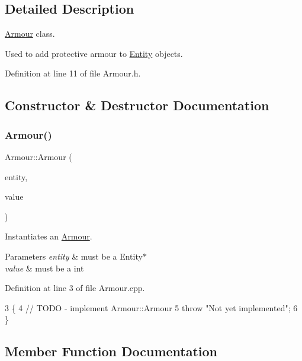 \subsection{Detailed Description}
\hyperlink{classArmour}{Armour} class. 

Used to add protective armour to \hyperlink{classEntity}{Entity} objects. 

Definition at line 11 of file Armour.\+h.



\subsection{Constructor \& Destructor Documentation}
\mbox{\label{classArmour_a795c5149e3e502530926aff4a6ade971}} 
\subsubsection{\texorpdfstring{Armour()}{Armour()}}
{\footnotesize\ttfamily Armour\+::\+Armour (\begin{DoxyParamCaption}\item[{\hyperlink{classEntity}{Entity} $\ast$}]{entity,  }\item[{int}]{value }\end{DoxyParamCaption})}



Instantiates an \hyperlink{classArmour}{Armour}. 


\begin{DoxyParams}{Parameters}
{\em entity} & must be a Entity$\ast$ \\
\hline
{\em value} & must be a int \\
\hline
\end{DoxyParams}


Definition at line 3 of file Armour.\+cpp.


\begin{DoxyCode}
3                                         \{
4     \textcolor{comment}{// TODO - implement Armour::Armour}
5     \textcolor{keywordflow}{throw} \textcolor{stringliteral}{"Not yet implemented"};
6 \}
\end{DoxyCode}


\subsection{Member Function Documentation}
\mbox{\label{classArmour_acce6c768aaebaa559ac063e9d67c53b5}} 
